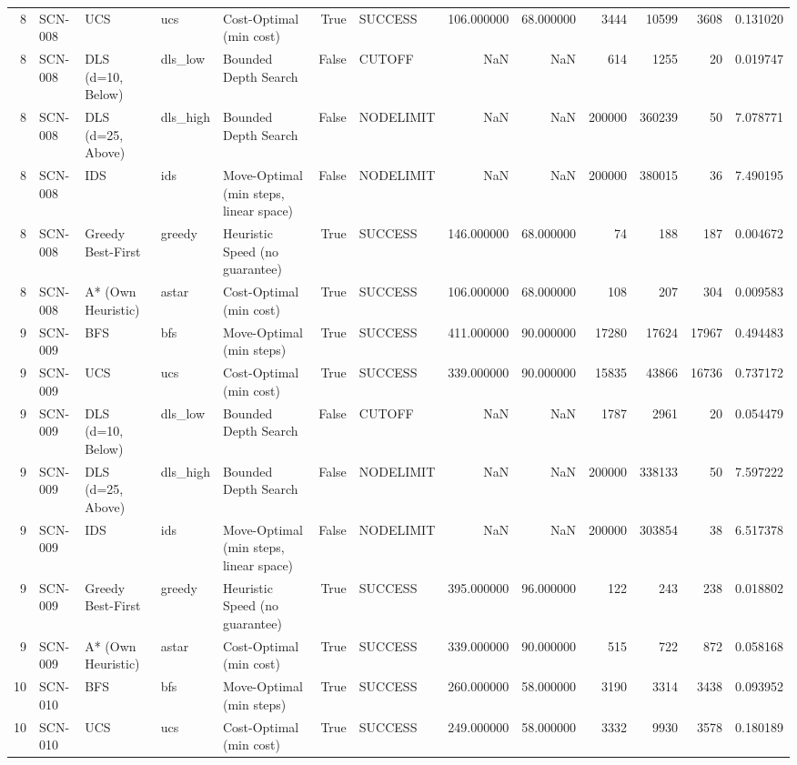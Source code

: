\begin{table}[htbp]
\begin{tabular}{rllllrlrrrrrr}
8 & SCN-008 & UCS & ucs & Cost-Optimal (min cost) & True & SUCCESS & 106.000000 & 68.000000 & 3444 & 10599 & 3608 & 0.131020 \\
8 & SCN-008 & DLS (d=10, Below) & dls\_low & Bounded Depth Search & False & CUTOFF & NaN & NaN & 614 & 1255 & 20 & 0.019747 \\
8 & SCN-008 & DLS (d=25, Above) & dls\_high & Bounded Depth Search & False & NODELIMIT & NaN & NaN & 200000 & 360239 & 50 & 7.078771 \\
8 & SCN-008 & IDS & ids & Move-Optimal (min steps, linear space) & False & NODELIMIT & NaN & NaN & 200000 & 380015 & 36 & 7.490195 \\
8 & SCN-008 & Greedy Best-First & greedy & Heuristic Speed (no guarantee) & True & SUCCESS & 146.000000 & 68.000000 & 74 & 188 & 187 & 0.004672 \\
8 & SCN-008 & A* (Own Heuristic) & astar & Cost-Optimal (min cost) & True & SUCCESS & 106.000000 & 68.000000 & 108 & 207 & 304 & 0.009583 \\
9 & SCN-009 & BFS & bfs & Move-Optimal (min steps) & True & SUCCESS & 411.000000 & 90.000000 & 17280 & 17624 & 17967 & 0.494483 \\
9 & SCN-009 & UCS & ucs & Cost-Optimal (min cost) & True & SUCCESS & 339.000000 & 90.000000 & 15835 & 43866 & 16736 & 0.737172 \\
9 & SCN-009 & DLS (d=10, Below) & dls\_low & Bounded Depth Search & False & CUTOFF & NaN & NaN & 1787 & 2961 & 20 & 0.054479 \\
9 & SCN-009 & DLS (d=25, Above) & dls\_high & Bounded Depth Search & False & NODELIMIT & NaN & NaN & 200000 & 338133 & 50 & 7.597222 \\
9 & SCN-009 & IDS & ids & Move-Optimal (min steps, linear space) & False & NODELIMIT & NaN & NaN & 200000 & 303854 & 38 & 6.517378 \\
9 & SCN-009 & Greedy Best-First & greedy & Heuristic Speed (no guarantee) & True & SUCCESS & 395.000000 & 96.000000 & 122 & 243 & 238 & 0.018802 \\
9 & SCN-009 & A* (Own Heuristic) & astar & Cost-Optimal (min cost) & True & SUCCESS & 339.000000 & 90.000000 & 515 & 722 & 872 & 0.058168 \\
10 & SCN-010 & BFS & bfs & Move-Optimal (min steps) & True & SUCCESS & 260.000000 & 58.000000 & 3190 & 3314 & 3438 & 0.093952 \\
10 & SCN-010 & UCS & ucs & Cost-Optimal (min cost) & True & SUCCESS & 249.000000 & 58.000000 & 3332 & 9930 & 3578 & 0.180189 \\

\end{tabular}
\end{table}

